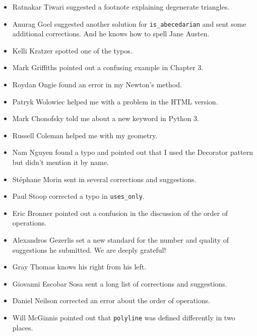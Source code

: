 \begin{itemize}
\item Ratnakar Tiwari suggested a footnote explaining degenerate
triangles.

\item Anurag Goel suggested another solution for \verb|is_abecedarian|
and sent some additional corrections.  And he knows how to
spell Jane Austen.

\item Kelli Kratzer spotted one of the typos.

\item Mark Griffiths pointed out a confusing example in Chapter 3.

\item Roydan Ongie found an error in my Newton's method.

\item Patryk Wolowiec helped me with a problem in the HTML version.

\item Mark Chonofsky told me about a new keyword in Python 3.

\item Russell Coleman helped me with my geometry.

\item Nam Nguyen found a typo and pointed out that I used the Decorator
pattern but didn't mention it by name.

\item St\'{e}phane Morin sent in several corrections and suggestions.

\item Paul Stoop corrected a typo in \verb+uses_only+.

\item Eric Bronner pointed out a confusion in the discussion of the
order of operations.

\item Alexandros Gezerlis set a new standard for the number and
quality of suggestions he submitted.  We are deeply grateful!

\item Gray Thomas knows his right from his left.

\item Giovanni Escobar Sosa sent a long list of corrections and
suggestions.

\item Daniel Neilson corrected an error about the order of operations.

\item Will McGinnis pointed out that \texttt{polyline} was defined
differently in two places.


\end{itemize}

